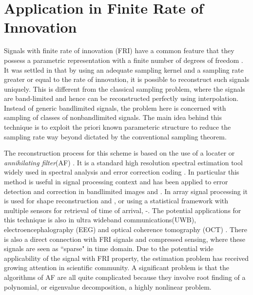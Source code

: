 \documentclass{UCF_ETD}
\begin{document}
\section{Application in Finite Rate of Innovation}
Signals with finite rate of innovation (FRI) have a common feature that they possess a parametric representation with a finite number of degrees of freedom \cite{Vetterli2002}. It was settled in \cite{Vetterli2002} that by using an adequate sampling kernel and a sampling rate greater or equal to the rate of innovation, it is possible to reconstruct such signals uniquely. This is different from the classical sampling problem, where the signals are band-limited and hence can be reconstructed perfectly using interpolation. Instead of generic bandlimited signals, the problem here is concerned with sampling of classes of nonbandlimited signals. The main idea behind this technique is to exploit the priori known parameteric structure to reduce the sampling rate way beyond dictated by the conventional sampling theorem.

The reconstruction process for this scheme is based on the use of a locater or \emph{annihilating filter}(AF) \cite{Luigi2007}. It is a standard high resolution spectral estimation tool widely used in spectral analysis \cite{Stoica1997} and error correction coding \cite{Blahut1994}. In particular this method is useful in signal processing context and has been applied to error detection and correction in bandlimited images \cite{Ferreira1997} and \cite{Vieira1997}. In array signal processing it is used for shape reconstruction \cite{Milanfar1995} and \cite{Milanfar2004}, or using a statistical framework with multiple sensors for retrieval of time of arrival, \cite{Huaijin1997}-\cite{Weiss1988}. The potential applications for this technique is also in ultra wideband communications(UWB), electroencephalography (EEG) and optical coherence tomography (OCT) \cite{Thierry2008}. There is also a direct connection with FRI signals and compressed sensing, where these signals are seen as ``sparse" in time domain. Due to the potential wide applicability of the signal with FRI property, the estimation problem has received growing attention in scientific community. A significant problem is that the algorithms of AF are all quite complicated because they involve root finding of a polynomial, or eigenvalue decomposition, a highly nonlinear problem.
\end{document}
